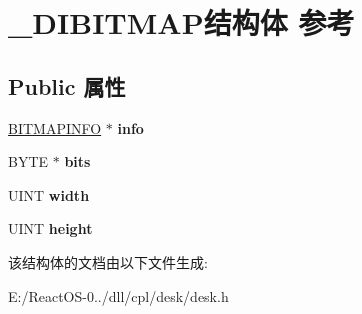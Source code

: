 \hypertarget{struct___d_i_b_i_t_m_a_p}{}\section{\+\_\+\+D\+I\+B\+I\+T\+M\+A\+P结构体 参考}
\label{struct___d_i_b_i_t_m_a_p}
\subsection*{Public 属性}
\begin{DoxyCompactItemize}
\item 
\mbox{\label{struct___d_i_b_i_t_m_a_p_ab718114a84275b88458f853686fc3d65}} 
\hyperlink{structtag_b_i_t_m_a_p_i_n_f_o}{B\+I\+T\+M\+A\+P\+I\+N\+FO} $\ast$ {\bfseries info}
\item 
\mbox{\label{struct___d_i_b_i_t_m_a_p_a10d327074dbc4d40cd8c352a497bd197}} 
B\+Y\+TE $\ast$ {\bfseries bits}
\item 
\mbox{\label{struct___d_i_b_i_t_m_a_p_a797b81535966495a8ae59160a8c60879}} 
U\+I\+NT {\bfseries width}
\item 
\mbox{\label{struct___d_i_b_i_t_m_a_p_a21b7853ee8681c79879b3be389c20092}} 
U\+I\+NT {\bfseries height}
\end{DoxyCompactItemize}


该结构体的文档由以下文件生成\+:\begin{DoxyCompactItemize}
\item 
E\+:/\+React\+O\+S-\/0../dll/cpl/desk/desk.\+h\end{DoxyCompactItemize}
